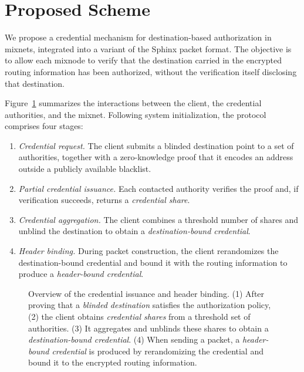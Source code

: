 \section{Proposed Scheme}
\label{sec:scheme}

We propose a credential mechanism for destination-based authorization in mixnets, integrated into a variant of the Sphinx packet format. 
The objective is to allow each mixnode to verify that the destination carried in the encrypted routing information has been authorized, without the verification itself disclosing that destination. 

Figure~\ref{fig:architecture} summarizes the interactions between the client, the credential authorities, and the mixnet. 
Following system initialization, the protocol comprises four stages:
\begin{enumerate}
    \item \emph{Credential request.}
    The client submits a blinded destination point to a set of authorities,
    together with a zero-knowledge proof that it encodes an address outside
    a publicly available blacklist.
    \item \emph{Partial credential issuance.}
    Each contacted authority verifies the proof and, if verification succeeds,
    returns a \emph{credential share}.
    \item \emph{Credential aggregation.}
    The client combines a threshold number of shares and unblind the
    destination to obtain a \emph{destination-bound credential}.
    \item \emph{Header binding.}
    During packet construction, the client rerandomizes the destination-bound
    credential and bound it with the routing information to produce a
    \emph{header-bound credential}.
\end{enumerate}

\begin{figure}[t]
    \centering
    \resizebox{\linewidth}{!}{}
    \caption{Overview of the credential issuance and header binding. 
    (1) After proving that a \emph{blinded destination} satisfies the authorization policy, 
    (2) the client obtains \emph{credential shares} from a threshold set of authorities. 
    (3) It aggregates and unblinds these shares to obtain a \emph{destination-bound credential}.
    (4) When sending a packet, a \emph{header-bound credential} is produced by rerandomizing the credential and bound it to the encrypted routing information.}
    \label{fig:architecture}
\end{figure}


